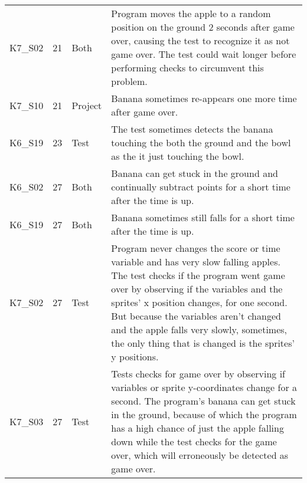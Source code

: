\begin{table}[htpb]
{\begin{tabular}{lrlp{11.25cm}}
        K7\_S02 & 21   & Both    & Program moves the apple to a random position on the ground 2 seconds after game over, causing the test to recognize it as not game over.
                                   The test could wait longer before performing checks to circumvent this problem. \\
        K7\_S10 & 21   & Project & Banana sometimes re-appears one more time after game over. \\
        K6\_S19 & 23   & Test    & The test sometimes detects the banana touching the both the ground and the bowl as the it just touching the bowl. \\

        K6\_S02 & 27   & Both    & Banana can get stuck in the ground and continually subtract points for a short time after the time is up. \\
        K6\_S19 & 27   & Both    & Banana sometimes still falls for a short time after the time is up. \\
        K7\_S02 & 27   & Test    & Program never changes the score or time variable and has very slow falling apples.
                                   The test checks if the program went game over by observing if the variables and the sprites' x position changes, for one second.
                                   But because the variables aren't changed and the apple falls very slowly, sometimes, the only thing that is changed is the sprites' y positions. \\
        K7\_S03 & 27   & Test    & Tests checks for game over by observing if variables or sprite y-coordinates change for a second.
                                   The program's banana can get stuck in the ground, because of which the program has a high chance of just the apple falling down while the test checks for the game over,
                                   which will erroneously be detected as game over. \\
        \bottomrule
    \end{tabular}
    }


\end{table}
